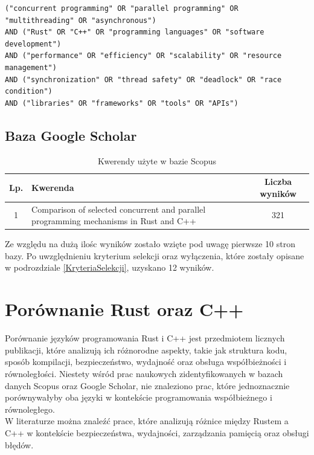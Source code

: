 \lstset{breaklines=true}
\begin{lstlisting}[caption=Kwerenda wygenerowana przez AI, label=AIQuery]
("concurrent programming" OR "parallel programming" OR "multithreading" OR "asynchronous")
AND ("Rust" OR "C++" OR "programming languages" OR "software development")
AND ("performance" OR "efficiency" OR "scalability" OR "resource management")
AND ("synchronization" OR "thread safety" OR "deadlock" OR "race condition")
AND ("libraries" OR "frameworks" OR "tools" OR "APIs")
\end{lstlisting}

\subsection{Baza Google Scholar}
\begin{table}[H]
    \caption{Kwerendy użyte w bazie Scopus \protect \footnotemark}
    \label{table:literatureReviewQueries}
    \begin{tabular}{|c|p{11cm}|c|}
    \hline
    Lp. & Kwerenda & Liczba wyników \\ \hline
    1 & Comparison of selected concurrent and parallel programming mechanisms in Rust and C++ & 321 \\ \hline

    \end{tabular}
\end{table}
Ze względu na dużą ilośc wyników zostało wzięte pod uwagę pierwsze 10 stron bazy. Po uwzględnieniu kryterium selekcji oraz wyłączenia, które zostały opisane w podrozdziale \ref{KryteriaSelekcji}, uzyskano 12 wyników.\\

\section{Porównanie Rust oraz C++}
Porównanie języków programowania Rust i C++ jest przedmiotem licznych publikacji, które analizują ich różnorodne aspekty, takie jak struktura kodu, sposób kompilacji, bezpieczeństwo, wydajność oraz obsługa współbieżności i równoległości. Niestety wśród prac naukowych zidentyfikowanych w bazach danych Scopus oraz Google Scholar, nie znaleziono prac, które jednoznacznie porównywałyby oba języki w kontekście programowania współbieżnego i równoległego.\\
W literaturze można znaleźć prace, które analizują różnice między Rustem a C++ w kontekście bezpieczeństwa, wydajności, zarządzania pamięcią oraz obsługi błędów.

